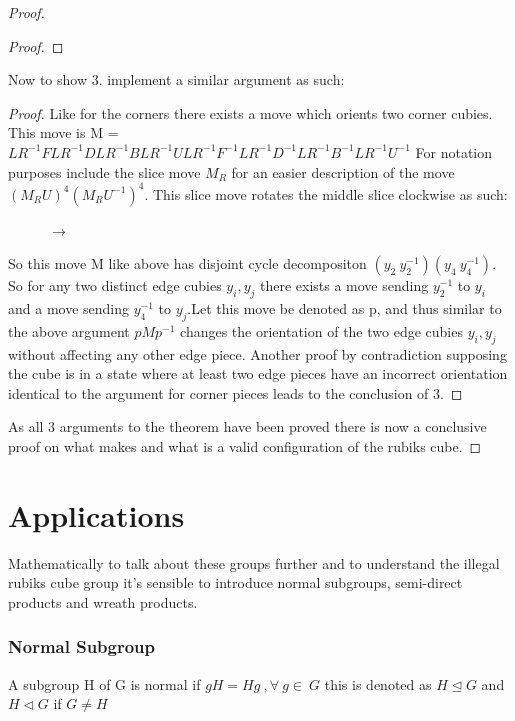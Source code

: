 \documentclass{article}
\begin{document}
\begin{proof}
\begin{proof}
\end{proof}Now to show 3. implement a similar argument as such:
\begin{proof}
Like for the corners there exists a move which orients two corner cubies. This move is M = $LR^{-1}FLR^{-1}DLR^{-1}BLR^{-1}ULR^{-1}F^{-1}LR^{-1}D^{-1}LR^{-1}B^{-1}LR^{-1}U^{-1}$
\newline For notation purposes include the slice move $M_{R}$ for an easier description of the move $(M_{R}U)^{4}(M_{R}U^{-1})^{4}$. This slice move rotates the middle slice clockwise as such:
\begin{figure}[h]
\RubikCubeSolved%
%
%
\hspace{.5cm}
\hspace{1cm}$\longrightarrow$
\hspace{1cm}
%
\end{figure}
So this move M like above has disjoint cycle decompositon $(y_2\ y_2^{-1})(y_4\ y_4^{-1})$. So for any two distinct edge cubies $y_i, y_j$ there exists a move sending $y_2^{-1}$ to $y_i$ and a move sending $y_4^{-1}$ to $y_j$.Let this move be denoted as p, and thus similar to the above argument $pMp^{-1}$ changes the orientation of the two edge cubies $y_i, y_j$ without affecting any other edge piece. Another proof by contradiction supposing the cube is in a state where at least two edge pieces have an incorrect orientation identical to the argument for corner pieces leads to the conclusion of 3.
\end{proof}
As all 3 arguments to the theorem have been proved there is now a conclusive proof on what makes and what is a valid configuration of the rubiks cube.
\end{proof}

\newpage
\section{Applications}

Mathematically to talk about these groups further and to understand the illegal rubiks cube group it's sensible to introduce normal subgroups, semi-direct products and wreath products. 

\subsubsection{Normal Subgroup}
A subgroup H of G is normal if $ gH=Hg\ , \forall \ g \in \ G$ this is denoted as $H\trianglelefteq G$ and $H\triangleleft G$ if $G \neq H$
\end{document}
